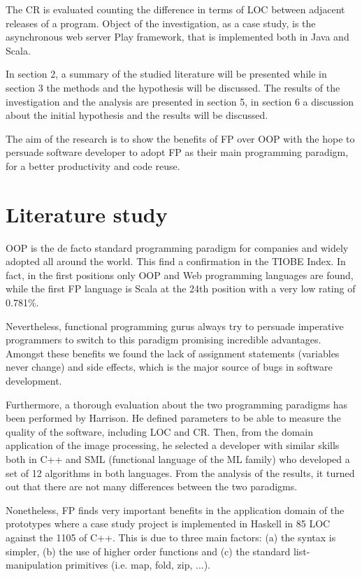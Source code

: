 \documentclass{article}
\begin{document}
The CR is evaluated counting the difference in terms of LOC between adjacent releases of a program. Object of the investigation, as a case study, is the asynchronous web server Play framework\cite{play}, that is implemented both in Java and Scala.

In section 2, a summary of the studied literature will be presented while in section 3 the methods and the hypothesis will be discussed. The results of the investigation and the analysis are presented in section 5, in section 6 a discussion about the initial hypothesis and the results will be discussed.

The aim of the research is to show the benefits of FP over OOP with the hope to persuade software developer to adopt FP as their main programming paradigm, for a better productivity and code reuse. 

\section{Literature study}

OOP is the de facto standard programming paradigm for companies and widely adopted all around the world. This find a confirmation in the TIOBE Index\cite{tiobe}. In fact, in the first positions only OOP and Web programming languages are found, while the first FP language is Scala at the 24th position with a very low rating of 0.781\%.

Nevertheless, functional programming gurus always try to persuade imperative programmers to switch to this paradigm promising incredible advantages. Amongst these benefits we found the lack of assignment statements (variables never change) and side effects, which is the major source of bugs in software development\cite{fpmatter}.

Furthermore, a thorough evaluation about the two programming paradigms has been performed by Harrison\cite{harrison}. He defined parameters to be able to measure the quality of the software, including LOC and CR. Then, from the domain application of the image processing, he selected a developer with similar skills both in C++ and SML (functional language of the ML family) who developed a set of 12 algorithms in both languages. From the analysis of the results, it turned out that there are not many differences between the two paradigms.

Nonetheless, FP finds very important benefits in the application domain of the prototypes where a case study project is implemented in Haskell in 85 LOC against the 1105 of C++\cite{Haskell-vs-ada}. This is due to three main factors: (a) the syntax is simpler, (b) the use of higher order functions and (c) the standard list-manipulation primitives (i.e. map, fold, zip, ...).
\end{document}

